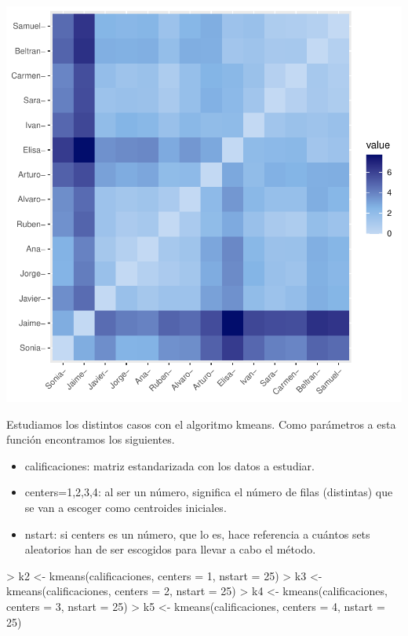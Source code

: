 \documentclass[a4paper]{article}
\begin{document}
\begin{Schunk}
\end{Schunk}
\includegraphics{practica4-011}

Estudiamos los distintos casos con el algoritmo kmeans. Como parámetros a esta función encontramos los siguientes. 
\begin{itemize}
     \item calificaciones: matriz estandarizada con los datos a estudiar.
     \item centers={1,2,3,4}: al ser un número, significa el número de filas (distintas) que se van a escoger como centroides iniciales.
     \item nstart: si centers es un número, que lo es, hace referencia a cuántos sets aleatorios han de ser escogidos para llevar a cabo el método.
\end{itemize}

\begin{Schunk}
\begin{Sinput}
> k2 <- kmeans(calificaciones, centers = 1, nstart = 25)
> k3 <- kmeans(calificaciones, centers = 2, nstart = 25)
> k4 <- kmeans(calificaciones, centers = 3, nstart = 25)
> k5 <- kmeans(calificaciones, centers = 4, nstart = 25)
\end{Sinput}
\end{Schunk}
\end{document}
